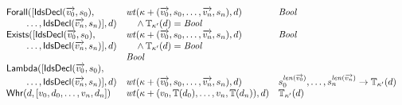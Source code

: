 \documentclass[fleqn,a4paper,dvips]{article}
\newcommand{\aterm}[1]{\mathsf{#1}}
\newcommand{\type}{\mathbb{T}}
\newcommand{\wt}{\nm{wt}}
\begin{document}
\begin{displaymath}
\begin{array}{lll}
\aterm{Forall}([\aterm{IdsDecl}(\vect{v_0},s_0),\
                                     &  \wt(\kappa+(\vect{v_0},s_0,\dots,\vect{v_n},s_n),d)       & \Bool\\
\t2\dots,\aterm{IdsDecl}(\vect{v_n},s_n)], d)
                                     & \t1\land\type_{\kappa'}(d)=\Bool                                     &\\
\aterm{Exists}([\aterm{IdsDecl}(\vect{v_0},s_0),
                                     & \wt(\kappa+(\vect{v_0},s_0,\dots,\vect{v_n},s_n),d)        & \Bool\\
\t2\dots,\aterm{IdsDecl}(\vect{v_n},s_n)], d)        
                                     & \t1\land\type_{\kappa'}(d)=\Bool                                     &\\
                   & \Bool\\
\aterm{Lambda}([\aterm{IdsDecl}(\vect{v_0},s_0),\\
\t2\dots,\aterm{IdsDecl}(\vect{v_n},s_n)], d)
                                    & \wt(\kappa+(\vect{v_0},s_0,\dots,\vect{v_n},s_n),d)         & s_0^{\nm{len}(\vect{v_0})},\dots,s_n^{\nm{len}(\vect{v_n})}\to\type_{\kappa'}(d)\\
\aterm{Whr}(d,[v_0,d_0,\dots,v_n,d_n])& \wt(\kappa+(v_0,\type(d_0),\dots,v_n,\type(d_n)),d)       & \type_{\kappa'}(d)
\end{array}
\end{displaymath}
\end{document}
